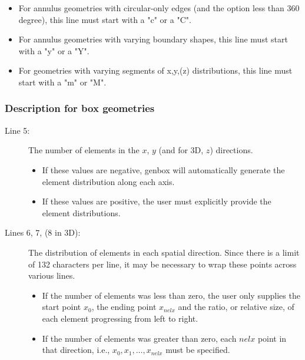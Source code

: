 \begin{description}
\begin{itemize}
      \item For annulus geometries with circular-only edges (and the option
        less than 360 degree), this line must start with a "c" or a "C".

      \item For annulus geometries with varying boundary shapes, this line must
        start with a "y" or a "Y".

      \item For geometries with varying segments of x,y,(z) distributions, this
        line must start with a "m" or "M".

    \end{itemize}

\end{description}

\subsubsection{Description for box geometries}

\begin{description}

  \item[Line 5:] The number of elements in the \(x\), \(y\) (and for 3D, \(z\))
    directions.  
    
    \begin{itemize}

      \item If these values are negative, genbox will automatically generate
        the element distribution along each axis. 

      \item If these values are positive, the user must explicitly provide the
        element distributions.  

    \end{itemize}
    

  \item[Lines 6, 7, (8 in 3D):] The distribution of elements in each
    spatial direction. Since there is a limit of 132 characters per line, it
    may be necessary to wrap these points across various lines.

    \begin{itemize}

      \item If the number of elements was less than zero, the user only
        supplies the start point \(x_0\), the ending point \(x_{nelx}\) and the
        ratio, or relative size, of each element progressing from left to
        right.  

      \item If the number of elements was greater than zero, each $nelx$ point
        in that direction, i.e., \(x_0, x_1, \ldots, x_{nelx}\) must be
        specified.

    \end{itemize}

\end{description}

